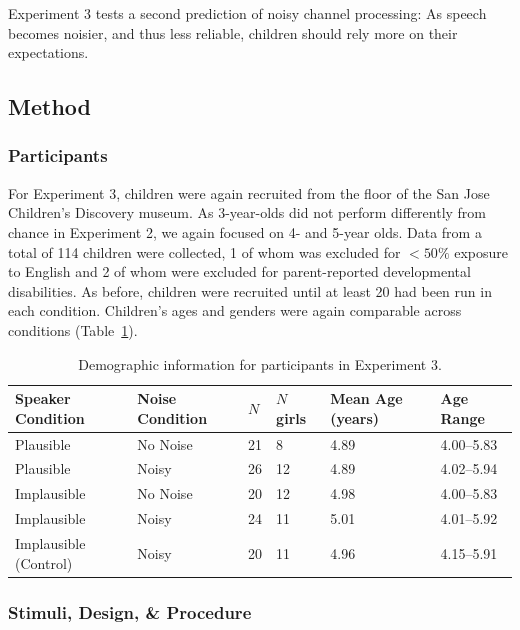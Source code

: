 \documentclass[man,floatsintext]{apa6}
\begin{document}
Experiment 3 tests a second prediction of noisy channel processing: As speech becomes noisier, and thus less reliable, children should rely more on their expectations.

\subsection{Method}

\subsubsection{Participants}

For Experiment 3, children were again recruited from the floor of the San Jose Children's Discovery museum. As 3-year-olds did not perform differently from chance in Experiment 2, we again focused on 4- and 5-year olds. Data from a total of 114 children were collected, 1 of whom was excluded for $<50\%$ exposure to English and 2 of whom were excluded for parent-reported developmental disabilities. As before, children were recruited until at least 20 had been run in each condition. Children's ages and genders were again comparable across conditions (Table~\ref{tab:exp3_demos}).


\begin{table}[tb]
\begin{center}
\begin{tabular}{llllll}
 Speaker Condition & Noise Condition & $N$ & $N$ girls & Mean Age (years) & Age Range\\ 
  \hline
  Plausible & No Noise & 21 & 8 & 4.89 & 4.00--5.83 \\ 
  Plausible & Noisy & 26 & 12 & 4.89 & 4.02--5.94 \\ 
  Implausible & No Noise & 20 & 12 & 4.98 & 4.00--5.83 \\ 
  Implausible & Noisy & 24 & 11 & 5.01 & 4.01--5.92 \\ 
  Implausible (Control) & Noisy & 20 & 11 & 4.96 & 4.15--5.91 \\ 
   \hline
\end{tabular}\end{center}
\vspace{6pt}
\caption{\label{tab:exp3_demos}Demographic information for participants in Experiment 3.}
\end{table}

\subsubsection{Stimuli, Design, \& Procedure}
\end{document}
